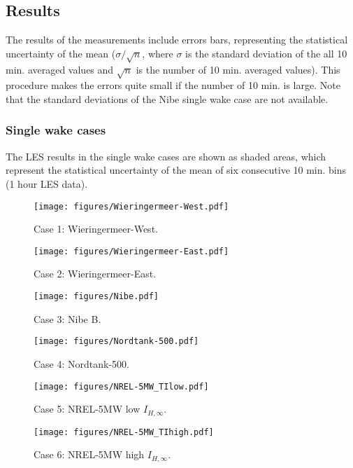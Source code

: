 \documentclass[a4paper,oneside]{article}
\begin{document}
\subsection{Results}
The results of the measurements include errors bars, representing the statistical uncertainty of the mean ($\sigma/\sqrt{n}$, where $\sigma$ is the standard deviation of the all 10 min. averaged values and  $\sqrt{n}$ is the number of 10 min. averaged values). 
This procedure makes the errors quite small if the number of 10 min. is large.
Note that the standard deviations of the Nibe single wake case are not available.

\subsubsection{Single wake cases}
The LES results in the single wake cases are shown as shaded areas, which represent the statistical uncertainty of the mean of six consecutive 10 min. bins (1 hour LES data).

\begin{figure}[h!]
\centering
\texttt{[image: figures/Wieringermeer-West.pdf]}
\caption{Case 1: Wieringermeer-West.}
\label{fig:Case1}
\end{figure}

\begin{figure}[h!]
\centering
\texttt{[image: figures/Wieringermeer-East.pdf]}
\caption{Case 2: Wieringermeer-East.}
\label{fig:Case2}
\end{figure}

\begin{figure}[h!]
\centering
\texttt{[image: figures/Nibe.pdf]}
\caption{Case 3: Nibe B.}
\label{fig:Case3}
\end{figure}

\begin{figure}[h!]
\centering
\texttt{[image: figures/Nordtank-500.pdf]}
\caption{Case 4: Nordtank-500.}
\label{fig:Case4}
\end{figure}

\begin{figure}[h!]
\centering
\texttt{[image: figures/NREL-5MW\_TIlow.pdf]}
\caption{Case 5: NREL-5MW low $I_{H,\infty}$.}
\label{fig:Case5}
\end{figure}

\clearpage
\begin{figure}[h!]
\centering
\texttt{[image: figures/NREL-5MW\_TIhigh.pdf]}
\caption{Case 6: NREL-5MW high $I_{H,\infty}$.}
\label{fig:Case6}
\end{figure}
\end{document}
